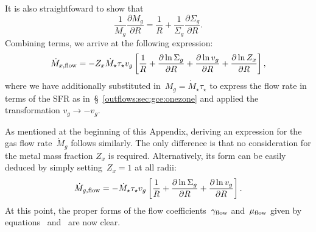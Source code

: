 \documentclass[main.tex]{subfiles}
\begin{document}
It is also straightfoward to show that
\begin{equation}
\frac{1}{M_g} \frac{\partial M_g}{\partial R} = \frac{1}{R} +
\frac{1}{\Sigma_g} \frac{\partial \Sigma_g}{\partial R}.
\end{equation}
Combining terms, we arrive at the following expression:
\begin{equation}
\dot{M}_{x,\text{flow}} = -Z_x \dot{M}_\star \tau_\star v_g
\left[
\frac{1}{R} +
\frac{\partial \ln \Sigma_g}{\partial R} +
\frac{\partial \ln v_g}{\partial R} +
\frac{\partial \ln Z_x}{\partial R}
\right],
\end{equation}
where we have additionally substituted in~$M_g = \dot{M}_\star \tau_\star$ to
express the flow rate in terms of the SFR as
in~\S~\ref{outflows:sec:gce:onezone} and applied the transformation
$v_g \rightarrow -v_g$.
\par
As mentioned at the beginning of this Appendix, deriving an expression for the
gas flow rate~$\dot{M}_g$ follows similarly.
The only difference is that no consideration for the metal mass fraction
$Z_x$ is required.
Alternatively, its form can be easily deduced by simply setting~$Z_x = 1$ at
all radii:
\begin{equation}
\dot{M}_{g,\text{flow}} = -\dot{M}_\star \tau_\star v_g \left[
\frac{1}{R} +
\frac{\partial \ln \Sigma_g}{\partial R} +
\frac{\partial \ln v_g}{\partial R}
\right].
\end{equation}
At this point, the proper forms of the flow coefficients~$\gamma_{\text{flow}}$
and~$\mu_{\text{flow}}$ given by equations~
and~ are now clear.
\end{document}
